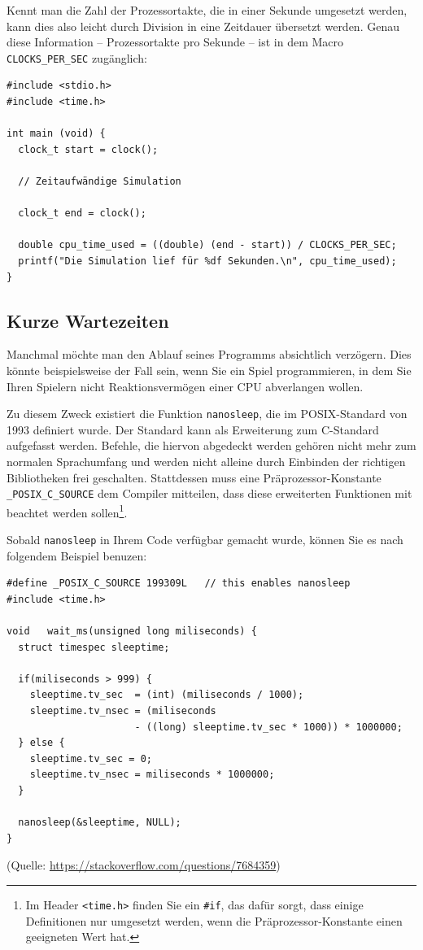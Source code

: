 Kennt man die Zahl der Prozessortakte, die in einer Sekunde umgesetzt werden, kann dies also leicht durch Division in eine Zeitdauer übersetzt werden. Genau diese Information -- Prozessortakte pro Sekunde -- ist in dem Macro \texttt{CLOCKS\_PER\_SEC} zugänglich:

\begin{codebox}
\begin{verbatim}
#include <stdio.h>
#include <time.h>
 
int main (void) {
  clock_t start = clock();
 
  // Zeitaufwändige Simulation
 
  clock_t end = clock();
  
  double cpu_time_used = ((double) (end - start)) / CLOCKS_PER_SEC; 
  printf("Die Simulation lief für %df Sekunden.\n", cpu_time_used);
}
\end{verbatim}
\end{codebox}

\subsection{Kurze Wartezeiten}
Manchmal möchte man den Ablauf seines Programms absichtlich verzögern. Dies könnte beispielsweise der Fall sein, wenn Sie ein Spiel programmieren, in dem Sie Ihren Spielern nicht Reaktionsvermögen einer CPU abverlangen wollen. 

Zu diesem Zweck existiert die Funktion \texttt{nanosleep}, die im POSIX-Standard von 1993 definiert wurde. Der Standard kann als Erweiterung zum C-Standard aufgefasst werden. Befehle, die hiervon abgedeckt werden gehören nicht mehr zum normalen Sprachumfang und werden nicht alleine durch Einbinden der richtigen Bibliotheken frei geschalten. Stattdessen muss eine Präprozessor-Konstante \texttt{\_POSIX\_C\_SOURCE} dem Compiler mitteilen, dass diese erweiterten Funktionen mit beachtet werden sollen\footnote{Im Header \texttt{<time.h>} finden Sie ein \texttt{#if}, das dafür sorgt, dass einige Definitionen nur umgesetzt werden, wenn die Präprozessor-Konstante einen geeigneten Wert hat.}.

Sobald \texttt{nanosleep} in Ihrem Code verfügbar gemacht wurde, können Sie es nach folgendem Beispiel benuzen:

\begin{codebox}
\begin{verbatim}
#define _POSIX_C_SOURCE 199309L   // this enables nanosleep
#include <time.h>

void   wait_ms(unsigned long miliseconds) {
  struct timespec sleeptime;
  
  if(miliseconds > 999) {   
    sleeptime.tv_sec  = (int) (miliseconds / 1000);
    sleeptime.tv_nsec = (miliseconds 
                      - ((long) sleeptime.tv_sec * 1000)) * 1000000;
  } else {   
    sleeptime.tv_sec = 0;
    sleeptime.tv_nsec = miliseconds * 1000000;
  }
  
  nanosleep(&sleeptime, NULL);
}
\end{verbatim}
\textrm{(Quelle:} \url{https://stackoverflow.com/questions/7684359}\textrm{)}
\end{codebox}

